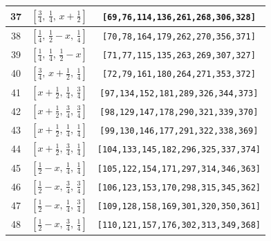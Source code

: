 \documentclass[fleqn,8pt]{jsarticle}
\begin{document}
\begin{longtable}{ccc}
37 & $\left[ \frac{3}{4},\, \frac{1}{4},\, x + \frac{1}{2} \right]$ & {\tt [69,76,114,136,261,268,306,328]} \\ \hline
38 & $\left[ \frac{1}{4},\, \frac{1}{2} - x,\, \frac{1}{4} \right]$ & {\tt [70,78,164,179,262,270,356,371]} \\ \hline
39 & $\left[ \frac{1}{4},\, \frac{1}{4},\, \frac{1}{2} - x \right]$ & {\tt [71,77,115,135,263,269,307,327]} \\ \hline
40 & $\left[ \frac{3}{4},\, x + \frac{1}{2},\, \frac{1}{4} \right]$ & {\tt [72,79,161,180,264,271,353,372]} \\ \hline
41 & $\left[ x + \frac{1}{2},\, \frac{1}{4},\, \frac{3}{4} \right]$ & {\tt [97,134,152,181,289,326,344,373]} \\ \hline
42 & $\left[ x + \frac{1}{2},\, \frac{3}{4},\, \frac{3}{4} \right]$ & {\tt [98,129,147,178,290,321,339,370]} \\ \hline
43 & $\left[ x + \frac{1}{2},\, \frac{1}{4},\, \frac{1}{4} \right]$ & {\tt [99,130,146,177,291,322,338,369]} \\ \hline
44 & $\left[ x + \frac{1}{2},\, \frac{3}{4},\, \frac{1}{4} \right]$ & {\tt [104,133,145,182,296,325,337,374]} \\ \hline
45 & $\left[ \frac{1}{2} - x,\, \frac{1}{4},\, \frac{1}{4} \right]$ & {\tt [105,122,154,171,297,314,346,363]} \\ \hline
46 & $\left[ \frac{1}{2} - x,\, \frac{3}{4},\, \frac{3}{4} \right]$ & {\tt [106,123,153,170,298,315,345,362]} \\ \hline
47 & $\left[ \frac{1}{2} - x,\, \frac{1}{4},\, \frac{3}{4} \right]$ & {\tt [109,128,158,169,301,320,350,361]} \\ \hline
48 & $\left[ \frac{1}{2} - x,\, \frac{3}{4},\, \frac{1}{4} \right]$ & {\tt [110,121,157,176,302,313,349,368]} \\
\end{longtable}
\renewcommand{\arraystretch}{1.2}
\end{document}
